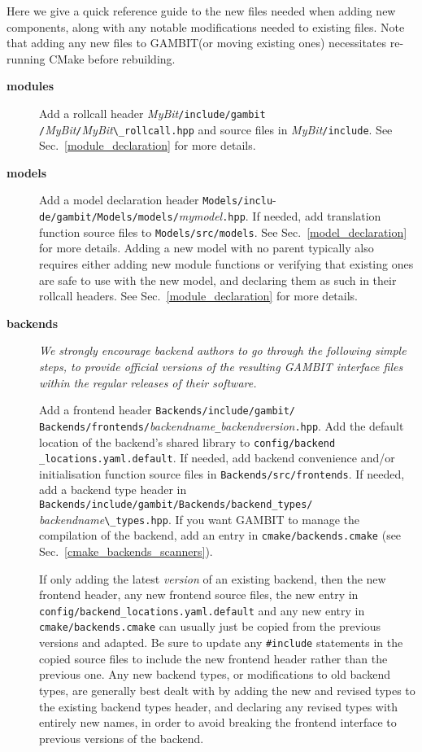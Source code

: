 \documentclass[pdftex,twocolumn,epjc3_preprint,runningheads]{svjour3}
\renewcommand{\_}{\discretionary{\underscore}{}{\underscore}}
\newcommand\cpp[1]{{\lstinline!#1!}}  %
\newcommand\term[1]{{\lstset{style=terminal}\lstinline!#1!\lstset{style=cpp}}}
\newcommand{\metavarf}[1]{\textit{\color{darkgreen}\footnotesize\textrm{#1}}}
\newcommand{\metavar}{\metavarf}
\newcommand{\gambit}{\textsf{GAMBIT}\xspace}
\newcommand{\GB}{\gambit}
\begin{document}
Here we give a quick reference guide to the new files needed when adding new components, along with any notable modifications needed to existing files.  Note that adding any new files to \GB (or moving existing ones) necessitates re-running \textsf{CMake} before rebuilding.
\begin{description}
\item[\textbf{modules}] Add a rollcall header \mbox{\metavar{MyBit}\term{/include/gambit}} \term{/}\metavar{MyBit}\term{/}\metavar{MyBit}\term{\_rollcall.hpp} and source files in \metavar{MyBit}\term{/include}. See Sec.\ \ref{module_declaration} for more details.
\item[\textbf{models}] Add a model declaration header \term{Models/inclu}-\term{de/gambit/}\term{Models/models/}\metavar{my\_model}\term{.hpp}. If needed, add translation function source files to \term{Models/src/models}. See Sec.\ \ref{model_declaration} for more details.  Adding a new model with no parent typically also requires either adding new module functions or verifying that existing ones are safe to use with the new model, and declaring them as such in their rollcall headers. See Sec.\ \ref{module_declaration} for more details.
\item[\textbf{backends}] \textit{We strongly encourage backend authors to go through the following simple steps, to provide official versions of the resulting \GB interface files within the regular releases of their software.}

\hspace{3mm} Add a frontend header \term{Backends/include/gambit/} \term{Backends/frontends/}\metavar{backend\_name}\term{_}\metavar{backend\_version}\term{.hpp}. Add the default location of the backend's shared library to \term{config/backend} \term{_locations.yaml.default}.  If needed, add backend convenience and/or initialisation function source files in \term{Backends/src/frontends}.  If needed, add a backend type header in \term{Backends/include/gambit/Backends/backend_types/} \metavar{backend\_name}\term{\_types.hpp}.  If you want \GB to manage the compilation of the backend, add an entry in \term{cmake/backends.cmake} (see Sec.\ \ref{cmake_backends_scanners}).

\hspace{3mm} If only adding the latest \textit{version} of an existing backend, then the new frontend header, any new frontend source files, the new entry in \term{config/backend_locations.yaml.default} and any new entry in \term{cmake/backends.cmake} can usually just be copied from the previous versions and adapted.  Be sure to update any \cpp{#include} statements in the copied source files to include the new frontend header rather than the previous one.  Any new backend types, or modifications to old backend types, are generally best dealt with by adding the new and revised types to the existing backend types header, and declaring any revised types with entirely new names, in order to avoid breaking the frontend interface to previous versions of the backend.


\end{description}
\end{document}
